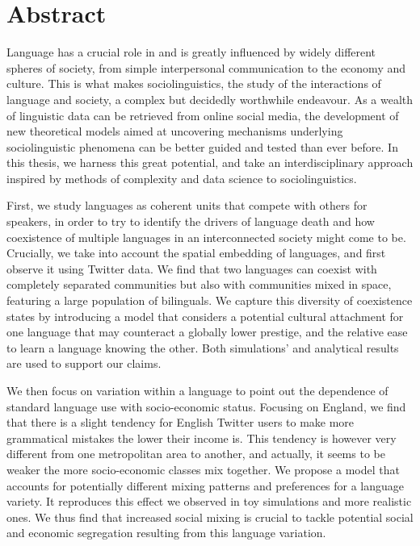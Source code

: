 \documentclass[../thesis.tex]{subfiles}
\begin{document}
\begingroup
\let\cleardoublepage\relax
\let\cleardoublepage\relax

\chapter*{Abstract}
Language has a crucial role in and is greatly influenced by widely different spheres of
society, from simple interpersonal communication to the economy and culture. This is
what makes sociolinguistics, the study of the interactions of language and society, a
complex but decidedly worthwhile endeavour. As a wealth of linguistic data can be
retrieved from online social media, the development of new theoretical models aimed at
uncovering mechanisms underlying sociolinguistic phenomena can be better guided and
tested than ever before. In this thesis, we harness this great potential, and take an
interdisciplinary approach inspired by methods of complexity and data science to
sociolinguistics.

First, we study languages as coherent units that compete with others for speakers, in
order to try to identify the drivers of language death and how coexistence of multiple
languages in an interconnected society might come to be. Crucially, we take into account
the spatial embedding of languages, and first observe it using Twitter data. We find
that two languages can coexist with completely separated communities but also with
communities mixed in space, featuring a large population of bilinguals. We capture this
diversity of coexistence states by introducing a model that considers a potential
cultural attachment for one language that may counteract a globally lower prestige, and
the relative ease to learn a language knowing the other. Both simulations' and
analytical results are used to support our claims.

We then focus on variation within a language to point out the dependence of standard
language use with socio-economic status. Focusing on England, we find
that there is a slight tendency for English Twitter users to make more grammatical
mistakes the lower their income is. This tendency is however very different from one
metropolitan area to another, and actually, it seems to be weaker the more
socio-economic classes mix together. We propose a model that accounts for potentially
different mixing patterns and preferences for a language variety. It reproduces this
effect we observed in toy simulations and more realistic ones.
We thus find that increased social mixing is crucial to tackle potential social and
economic segregation resulting from this language variation.
\end{document}
